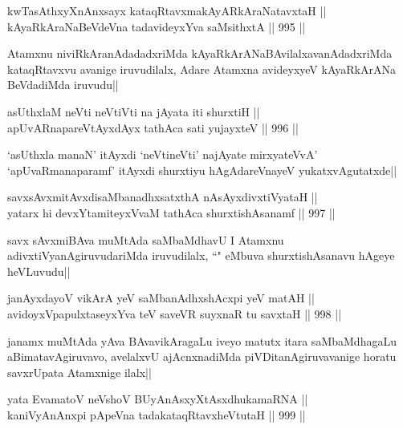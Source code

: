 \begin{shl}
kwTasAthxyXnAnxsayx kataqRtavxmakAyARkAraNatavxtaH || \\
kAyaRkAraNaBeVdeVna tadavideyxYva saMsithxtA ||  995 ||  
\end{shl}

\begin{artha}
Atamxnu niviRkAranAdadadxriMda kAyaRkArANaBAvilalxavanAdadxriMda kataqRtavxvu avanige iruvudilalx, Adare Atamxna avideyxyeV kAyaRkArANa BeVdadiMda iruvudu||
\end{artha}


\begin{shl}
asUthxlaM neVti neVtiVti na jAyata iti shurxtiH || \\
apUvARnapareVtAyxdAyx tathAca sati yujayxteV ||  996 ||  
\end{shl}

\begin{artha}
`asUthxla manaN' itAyxdi `neVtineVti' najAyate mirxyateVvA' `apUvaRmanaparamf' itAyxdi shurxtiyu hAgAdareVnayeV yukatxvAgutatxde||
\end{artha}

\begin{shl}
savxsAvxmitAvxdisaMbanadhxsatxthA nAsAyxdivxtiVyataH || \\
yatarx hi devxYtamiteyxVvaM tathAca shurxtishAsanamf ||  997 ||  
\end{shl}

\begin{artha}
savx sAvxmiBAva muMtAda saMbaMdhavU  I Atamxnu adivxtiVyanAgiruvudariMda iruvudilalx, ``\stext" eMbuva shurxtishAsanavu hAgeye heVLuvudu||
\end{artha}


\begin{shl}
janAyxdayoV vikArA yeV saMbanAdhxshAcxpi yeV matAH || \\
avidoyxVpapulxtaseyxYva teV saveVR suyxnaR tu savxtaH ||  998 ||  
\end{shl}

\begin{artha}
janamx muMtAda yAva BAvavikAragaLu iveyo matutx itara saMbaMdhagaLu aBimatavAgiruvavo, avelalxvU ajAcnxnadiMda piVDitanAgiruvavanige horatu savxrUpata Atamxnige ilalx||
\end{artha}

\begin{shl}
yata EvamatoV neVshoV BUyAnAsxyXtAsxdhukamaRNA || \\
kaniVyAnAnxpi pApeVna tadakataqRtavxheVtutaH ||  999 ||  
\end{shl}

